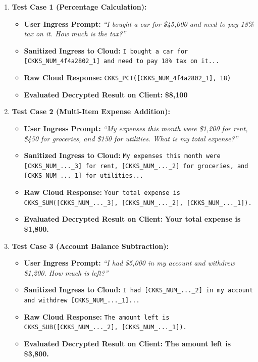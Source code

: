 \documentclass[12pt,a4paper,oneside]{report}
\numberwithin{equation}{chapter}
\begin{document}
\begin{enumerate}[leftmargin=*]
    \item \textbf{Test Case 1 (Percentage Calculation):}
    \begin{itemize}
        \item \textbf{User Ingress Prompt:} \textit{``I bought a car for \$45,000 and need to pay 18\% tax on it. How much is the tax?''}
        \item \textbf{Sanitized Ingress to Cloud:} \texttt{I bought a car for [CKKS\_NUM\_4f4a2802\_1] and need to pay 18\% tax on it...}
        \item \textbf{Raw Cloud Response:} \texttt{CKKS\_PCT([CKKS\_NUM\_4f4a2802\_1], 18)}
        \item \textbf{Evaluated Decrypted Result on Client:} \textbf{\$8,100}
    \end{itemize}
    \item \textbf{Test Case 2 (Multi-Item Expense Addition):}
    \begin{itemize}
        \item \textbf{User Ingress Prompt:} \textit{``My expenses this month were \$1,200 for rent, \$450 for groceries, and \$150 for utilities. What is my total expense?''}
        \item \textbf{Sanitized Ingress to Cloud:} \texttt{My expenses this month were [CKKS\_NUM\_...\_3] for rent, [CKKS\_NUM\_...\_2] for groceries, and [CKKS\_NUM\_...\_1] for utilities...}
        \item \textbf{Raw Cloud Response:} \texttt{Your total expense is CKKS\_SUM([CKKS\_NUM\_...\_3], [CKKS\_NUM\_...\_2], [CKKS\_NUM\_...\_1]).}
        \item \textbf{Evaluated Decrypted Result on Client:} \textbf{Your total expense is \$1,800.}
    \end{itemize}
    \item \textbf{Test Case 3 (Account Balance Subtraction):}
    \begin{itemize}
        \item \textbf{User Ingress Prompt:} \textit{``I had \$5,000 in my account and withdrew \$1,200. How much is left?''}
        \item \textbf{Sanitized Ingress to Cloud:} \texttt{I had [CKKS\_NUM\_...\_2] in my account and withdrew [CKKS\_NUM\_...\_1]...}
        \item \textbf{Raw Cloud Response:} \texttt{The amount left is CKKS\_SUB([CKKS\_NUM\_...\_2], [CKKS\_NUM\_...\_1]).}
        \item \textbf{Evaluated Decrypted Result on Client:} \textbf{The amount left is \$3,800.}
    \end{itemize}
\end{enumerate}
\end{document}

